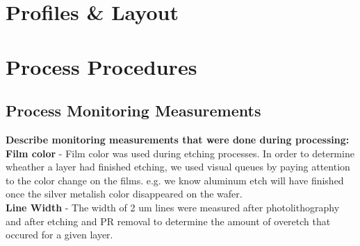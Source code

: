 \documentclass{article}
\begin{document}



\section{Profiles \& Layout}
\subsection{}
\subsection{}
\subsection{}
\section{Process Procedures}
\subsection{Process Monitoring Measurements}

\textbf{Describe monitoring measurements that were done during processing:} \\

\textbf{Film color} - 
Film color was used during etching processes. In order to determine wheather a layer had finished etching, we used visual queues by paying attention to the color change on the films. e.g. we know aluminum etch will have finished once the silver metalish color disappeared on the wafer. \\
 
\textbf{Line Width} - 
The width of 2 um lines were measured after photolithography and after etching and PR removal to determine the amount of overetch that occured for a given layer. \\
\end{document}
